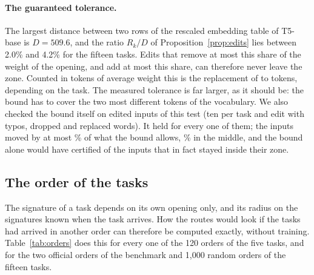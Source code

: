 \paragraph{The guaranteed tolerance.} The largest distance between two rows of the rescaled
embedding table of T5-base is $D = 509.6$, and the ratio $R_k / D$ of Proposition~\ref{prop:edits}
lies between 2.0\% and 4.2\% for the fifteen tasks. Edits that remove at most this share of the
weight of the opening, and add at most this share, can therefore never leave the zone. Counted in
tokens of average weight this is the replacement of \BoundTokensLow{} to \BoundTokensHigh{} tokens,
depending on the task. The measured tolerance is far larger, as it should be: the bound has to
cover the two most different tokens of the vocabulary. We also
checked the bound itself on \BoundInputs{} edited inputs of this test (ten per task and edit with
typos, dropped and replaced words). It held for every one of them; the inputs moved by at most
\BoundWorstPct{}\% of what the bound allows, \BoundMedianPct{}\% in the middle, and the bound
alone would have certified \BoundGuaranteed{} of the \BoundInside{} inputs that in fact stayed inside
their zone.


\subsection{The order of the tasks}
\label{sec:orders}

The signature of a task depends on its own opening only, and its radius on the signatures known
when the task arrives. How the routes would look if the tasks had arrived in another order can
therefore be computed exactly, without training. Table~\ref{tab:orders} does this for every one of
the 120 orders of the five tasks, and for the two official orders of the benchmark and 1{,}000 random
orders of the fifteen tasks.

\begin{table}[t]
  \caption{The order of the tasks (routes only, T5-base word-vectors). Entries with four numbers are
  for the original / light / medium / heavy wording; the reworded inputs are those of the five tasks.
  ``Blocked'': training inputs inside an older zone. ``Changed'': test inputs whose route changed
  after their task had been added; where a range is given it depends on the order.}
  \label{tab:orders}
  \centering
  \footnotesize
  \setlength{\tabcolsep}{3.5pt}
  
\end{table}

